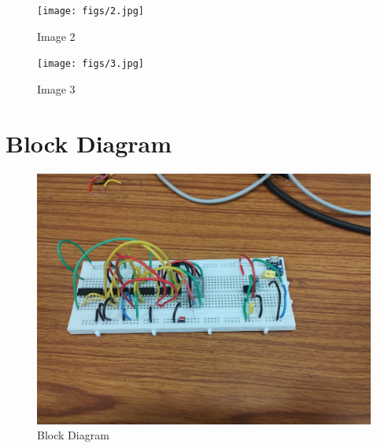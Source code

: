 \documentclass{article}
\begin{document}
\begin{figure}[ht]
	\centering
	\texttt{[image: figs/2.jpg]}
	\caption{Image 2}
	\label{fig:view}
\end{figure}
\FloatBarrier

\begin{figure}[ht]
	\centering
	\texttt{[image: figs/3.jpg]}
	\caption{Image 3}
	\label{fig:view}
\end{figure}
\FloatBarrier

\section*{Block Diagram}

\begin{figure}[ht]
	\centering
	\includegraphics[width=0.7\linewidth]{figs/BlockDiagram.jpg}
	\caption{Block Diagram}
	\label{fig:view}
\end{figure}
\FloatBarrier
\end{document}
